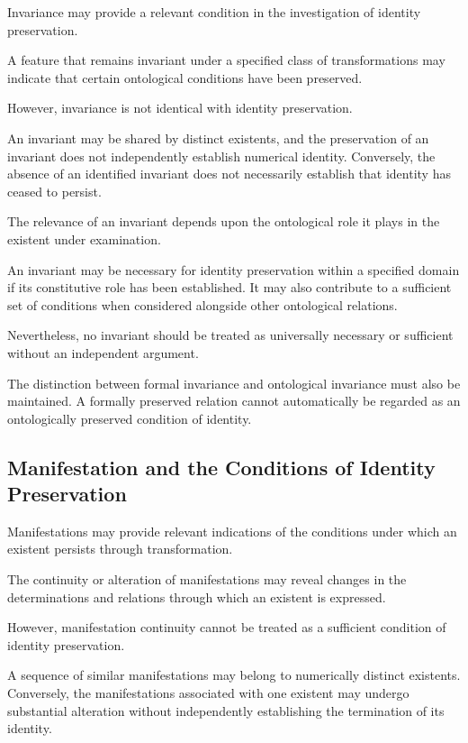 Invariance may provide a relevant condition in
the investigation of identity preservation.

A feature that remains invariant under a specified
class of transformations may indicate that certain
ontological conditions have been preserved.

However, invariance is not identical with identity
preservation.

An invariant may be shared by distinct existents,
and the preservation of an invariant does not
independently establish numerical identity.
Conversely, the absence of an identified invariant
does not necessarily establish that identity has
ceased to persist.

The relevance of an invariant depends upon the
ontological role it plays in the existent under
examination.

An invariant may be necessary for identity preservation
within a specified domain if its constitutive
role has been established. It may also contribute
to a sufficient set of conditions when considered
alongside other ontological relations.

Nevertheless, no invariant should be treated as
universally necessary or sufficient without an
independent argument.

The distinction between formal invariance and
ontological invariance must also be maintained.
A formally preserved relation cannot automatically
be regarded as an ontologically preserved condition
of identity.

\subsection{Manifestation and the Conditions of Identity Preservation}

Manifestations may provide relevant indications
of the conditions under which an existent persists
through transformation.

The continuity or alteration of manifestations
may reveal changes in the determinations and
relations through which an existent is expressed.

However, manifestation continuity cannot be treated
as a sufficient condition of identity preservation.

A sequence of similar manifestations may belong
to numerically distinct existents. Conversely,
the manifestations associated with one existent
may undergo substantial alteration without
independently establishing the termination of
its identity.

